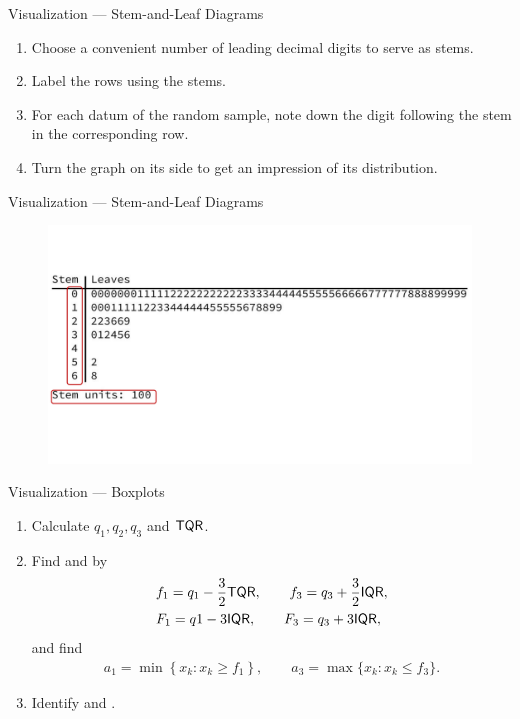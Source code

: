 \begin{frame}{Visualization --- Stem-and-Leaf Diagrams}

\begin{enumerate}
	\justifying
	\item Choose a convenient number of leading decimal digits to serve as stems.
	\item Label the rows using the stems.
	\item For each datum of the random sample, note down the digit following the stem in the corresponding row.
	\item Turn the graph on its side to get an impression of its distribution.
\end{enumerate}

\end{frame}

\begin{frame}{Visualization --- Stem-and-Leaf Diagrams}

\begin{figure}[htbp]
	\centering
	\includegraphics[width=\linewidth]{./images/rc4fig1.pdf}
\end{figure}

\end{frame}


\begin{frame}{Visualization --- Boxplots}

\begin{enumerate}
	\justifying
	\item Calculate $q_1, q_2, q_3$ and $\mathsf{TQR}$.
	\item Find  and  by
	\begin{align*}
	& f_1 = q_1 - \frac{3}{2}\mathsf{TQR}, \qquad f_3 = q_3 + \frac{3}{2}\mathsf{IQR}, \\
	& F_1 = q1 - 3\mathsf{IQR}, \qquad F_3 = q_3 + 3\mathsf{IQR},
	\end{align*}
	and find 
	\begin{align*}
	a_1 = \min\left\{x_k: x_k\geq f_1 \right\}, \qquad a_3 = \max\{x_k: x_k\leq f_3 \}.
	\end{align*}
	\item Identify  and .
\end{enumerate}

\end{frame}


